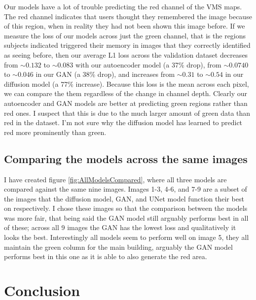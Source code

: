 \documentclass{UoYCSproject}
\begin{document}
Our models have a lot of trouble predicting the red channel of the VMS maps. The red channel indicates that users thought they remembered the image because of this region, when in reality they had not been shown this image before. If we measure the loss of our models across just the green channel, that is the regions subjects indicated triggered their memory in images that they correctly identified as seeing before, 
then our average L1 loss across the validation dataset decreases from \( \sim 0.132 \) to \(\sim 0.083\) with our autoencoder model (a 37\% drop), 
from \( \sim 0.0740 \) to \(\sim 0.046 \)  in our GAN (a 38\% drop), 
and increases from \(\sim 0.31 \) to \(\sim 0.54 \) in our diffusion model (a 77\% increase).
Because this loss is the mean across each pixel, we can compare the them regardless of the change in channel depth. Clearly our autoencoder and GAN models are better at predicting green regions rather than red ones. I suspect that this is due to the much larger amount of green data than red in the dataset. I'm not sure why the diffusion model has learned to predict red more prominently than green.

\section{Comparing the models across the same images}

I have created figure \ref{fig:AllModelsCompared}, where all three models are compared against the same nine images. Images 1-3, 4-6, and 7-9 are a subset of the images that the diffusion model, GAN, and UNet model function their best on respectively. I chose these images so that the comparison between the models was more fair, that being said the GAN model still arguably performs best in all of these; across all 9 images the GAN has the lowest loss and qualitatively it looks the best. Interestingly all models seem to perform well on image 5, they all maintain the green column for the main building, arguably the GAN model performs best in this one as it is able to also generate the red area.

\chapter{Conclusion}


\end{document}
